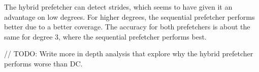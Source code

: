 The hybrid prefetcher can detect strides, which seems to have given it an
advantage on low degrees.
For higher degrees, the sequential prefetcher performs better due to a better
coverage.
The accuracy for both prefetchers is about the same for degree 3, where the
sequential prefetcher performs best.

// TODO: Write more in depth analysis that explore why the hybrid prefetcher performs worse than DC.


%
%
%  
%
%
%
%
%
%
